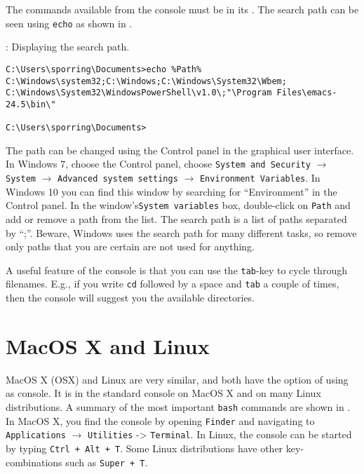 The commands available from the console must be in its . The search path can be seen using \lstinline[language=console]{echo} as shown in .
\begin{codeNOutput}[label=windowsPath]{: Displaying the search path.}
  \begin{lstlisting}[language=console,escapechar=§]
C:\Users\sporring\Documents>echo %Path%
C:\Windows\system32;C:\Windows;C:\Windows\System32\Wbem; C:\Windows\System32\WindowsPowerShell\v1.0\;"\Program Files\emacs-24.5\bin\"

C:\Users\sporring\Documents>
\end{lstlisting}
\end{codeNOutput}
The path can be changed using the Control panel in the graphical user interface. In Windows 7, choose the Control panel, choose \lstinline[language=console]{System and Security} $\rightarrow$ \lstinline[language=console]{System} $\rightarrow$ \lstinline[language=console]{Advanced system settings} $\rightarrow$ \lstinline[language=console]{Environment Variables}. In Windows 10 you can find this window by searching for ``Environment'' in the Control panel. In the window's\lstinline[language=console]{System variables} box, double-click on \lstinline[language=console]{Path} and add or remove a path from the list. The search path is a list of paths separated by ``;''. Beware, Windows uses the search path for many different tasks, so remove only paths that you are certain are not used for anything.

A useful feature of the console is that you can use the \lstinline[language=console]{tab}-key to cycle through filenames.  E.g., if you write \lstinline[language=console]{cd} followed by a space and \lstinline[language=console]{tab} a couple of times, then the console will suggest you the available directories.

\section{MacOS X and Linux}
MacOS X (OSX) and Linux are very similar, and both have the option of using  as console. It is in the standard console on MacOS X and on many Linux distributions. A summary of the most important \lstinline[language=console]{bash} commands are shown in . In MacOS X, you find the console by opening \lstinline[language=console]{Finder} and navigating to \lstinline[language=console]{Applications} $\rightarrow$ \lstinline[language=console]{Utilities} -> \lstinline[language=console]{Terminal}.  In Linux, the console can be started by typing \lstinline[language=console]{Ctrl + Alt + T}. Some Linux distributions have other key-combinations such as \lstinline[language=console]{Super + T}. 

